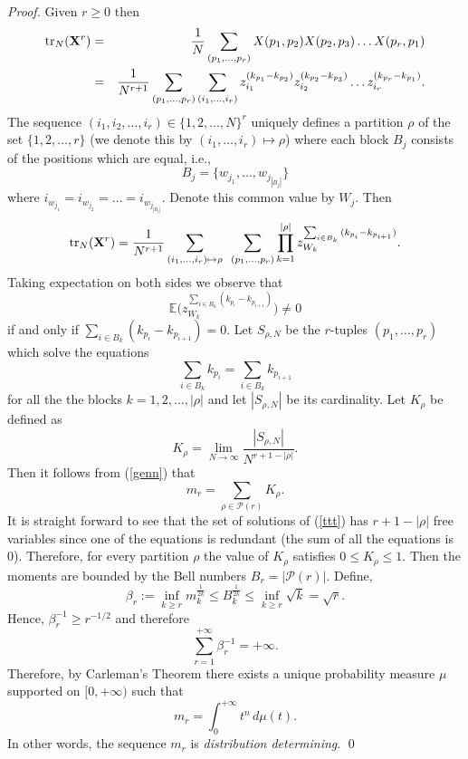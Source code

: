 \documentclass[smallextended]{svjour3}
\begin{document}
\begin{proof}

Given $r\geq 0$ then
\begin{eqnarray*}
\mathrm{tr}_{N}({\bf X}^{r}) & = & \frac{1}{N}\sum_{(p_1,\ldots,p_r)}{X(p_1,p_2)X(p_2,p_3)\ldots X(p_r,p_1)} \\
& = & \frac{1}{N^{r+1}}\sum_{(p_1,\ldots,p_r)} \sum_{(i_1,\ldots,i_r)} z_{i_1}^{(k_{p_1}-k_{p_2})}z_{i_2}^{(k_{p_2}-k_{p_3})}\ldots z_{i_r}^{(k_{p_r}-k_{p_1})}.
\end{eqnarray*}
The sequence $(i_1,i_2,\ldots,i_r)\in \{1,2,\ldots,N\}^{r}$ uniquely defines a partition $\rho$ of the set $\{1,2,\ldots,r\}$ (we denote this by $(i_1,\ldots,i_r)\mapsto \rho$)
where each block $B_{j}$ consists of the positions which are equal, i.e.,
$$
B_{j}=\{w_{j_1},\ldots,w_{j_{|B_j|}}\}
$$ 
where $i_{w_{j_1}}=i_{w_{j_2}}=\ldots=i_{w_{j_{|B_j|}}}$. Denote this common value by $W_{j}$. Then
\begin{equation}\label{genn}
\mathrm{tr}_{N}({\bf X}^{r}) = \frac{1}{N^{r+1}} \sum_{(i_1,\ldots,i_r)\mapsto \rho}\,\,\,\sum_{(p_1,\ldots,p_r)} \prod_{k=1}^{|\rho|}{z_{W_k}^{\sum_{i\in B_k}{(k_{p_i}-k_{p_{i+1}})}}}.
\end{equation}
Taking expectation on both sides we observe that 
$$
\mathbb{E}\Bigg(z_{W_k}^{\sum_{i\in B_k}{(k_{p_i}-k_{p_{i+1}})}}\Bigg)\neq 0
$$
if and only if $\sum_{i\in B_k}{(k_{p_i}-k_{p_{i+1}})}=0$. Let $S_{\rho,N}$ be the $r$-tuples $(p_1,\ldots,p_r)$ which solve the equations
\begin{equation}\label{ttt}
\sum_{i\in B_k}{k_{p_i}}=\sum_{i\in B_k}{k_{p_{i+1}}}
\end{equation}
for all the the blocks $k=1,2,\ldots,|\rho|$ and let $|S_{\rho,N}|$ be its cardinality. Let $K_{\rho}$ be defined as 
$$
K_{\rho}=\lim_{N\to\infty}\frac{|S_{\rho,N}|}{N^{r+1-|\rho|}}.
$$
Then it follows from (\ref{genn}) that 
$$
m_{r}=\sum_{\rho\in \mathcal{P}(r)}K_{\rho}.
$$
It is straight forward to see that the set of solutions of (\ref{ttt}) has $r+1-|\rho|$ free variables since one of the equations is redundant (the sum of all the equations is 0). Therefore, for every partition $\rho$ the value of $K_{\rho}$ satisfies $0\leq K_{\rho}\leq 1$. Then the moments are bounded by the Bell numbers $B_{r}=|\mathcal{P}(r)|$. Define, 
$$
\beta_{r}:=\inf_{k\geq r}{m_{k}^{\frac{1}{2k}}}\leq {B_{k}^{\frac{1}{2k}}}\leq \inf_{k\geq r}{\sqrt{k}}=\sqrt{r}.
$$
Hence, $\beta_{r}^{-1}\geq r^{-1/2}$ and therefore
$$
\sum_{r=1}^{+\infty}{\beta_{r}^{-1}}=+\infty.
$$
Therefore, by Carleman's Theorem \cite{Carleman} there exists a unique probability measure $\mu$ supported on $[0,+\infty)$ such that 
$$
m_{r}=\int_{0}^{+\infty}{t^{n}\,d\mu (t)}.
$$
In other words, the sequence $m_{r}$ is {\em distribution determining}. 
\qed \end{proof}
\end{document}
